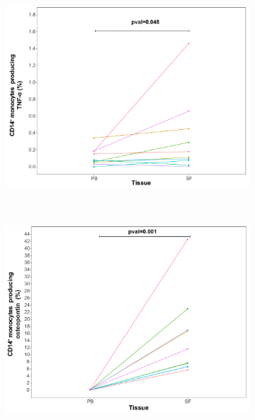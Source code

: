 \bigskip
\begin{figure}[H]
\centering
\begin{subfigure}[b]{0.40\textwidth}
\centering 
\includegraphics[width=\textwidth]{./Results3/pdfs/CyTOF_validation_cohort_TNFa_percentage}%
\caption{}
\end{subfigure}
~
\begin{subfigure}[b]{0.40\textwidth}
\centering 
\includegraphics[width=\textwidth]{./Results3/pdfs/CyTOF_validation_cohort_osteopontin_percentage}
\caption{}
\end{subfigure}
~
\begin{subfigure}[b]{0.45\textwidth} 
\centering

\end{subfigure}
\end{figure}
